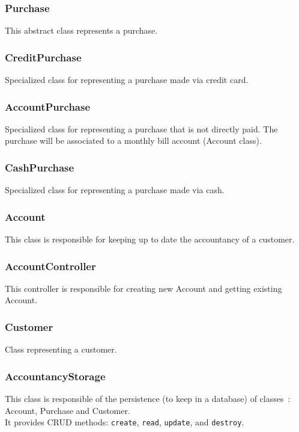 \documentclass[11pt, a4paper]{article}
\newcommand{\settextlisting}{\lstset{ basicstyle=\small\ttfamily }}
\begin{document}
\subsubsection*{Purchase}
This abstract class represents a purchase.

\subsubsection*{CreditPurchase}
Specialized class for representing a purchase made via credit card.

\subsubsection*{AccountPurchase}
Specialized class for representing a purchase that is not directly paid. The purchase will be associated to a monthly bill account (Account class).

\subsubsection*{CashPurchase}
Specialized class for representing a purchase made via cash.

\subsubsection*{Account}
This class is responsible for keeping up to date the accountancy of a customer.

\subsubsection*{AccountController}
This controller is responsible for creating new Account and getting existing Account.

\subsubsection*{Customer}
Class representing a customer.

\subsubsection*{AccountancyStorage}
\settextlisting
This class is responsible of the persistence (to keep in a database) of \mbox{classes :} Account, Purchase and Customer. \\
It provides CRUD methods: \lstinline|create|, \lstinline|read|, \lstinline|update|, and \lstinline|destroy|.
\end{document}
